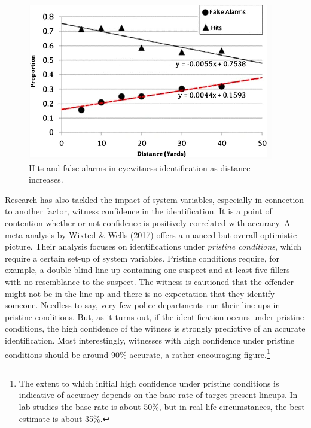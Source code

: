 \documentclass[
  10pt,
  dvipsnames,enabledeprecatedfontcommands]{scrartcl}
\begin{document}
\begin{figure}

\begin{center}\includegraphics[width=0.5\linewidth]{eyewitness-distance} \end{center}
\caption{Hits and false alarms in eyewitness identification 
as distance increases.}
\label{eyewitness-distance}
\end{figure}

Research has also tackled the impact of system variables, especially in
connection to another factor, witness confidence in the identification.
It is a point of contention whether or not confidence is positively
correlated with accuracy. A meta-analysis by Wixted \& Wells (2017)
offers a nuanced but overall optimistic picture. Their analysis focuses
on identifications under \emph{pristine conditions}, which require a
certain set-up of system variables. Pristine conditions require, for
example, a double-blind line-up containing one suspect and at least five
fillers with no resemblance to the suspect. The witness is cautioned
that the offender might not be in the line-up and there is no
expectation that they identify someone. Needless to say, very few police
departments run their line-ups in pristine conditions. But, as it turns
out, if the identification occurs under pristine conditions, the high
confidence of the witness is strongly predictive of an accurate
identification. Most interestingly, witnesses with high confidence under
pristine conditions should be around 90\% accurate, a rather encouraging
figure.\footnote{The extent to which initial high confidence under
  pristine conditions is indicative of accuracy depends on the base rate
  of target-present lineups. In lab studies the base rate is about 50\%,
  but in real-life circumstances, the best estimate is about 35\%.}
\end{document}
